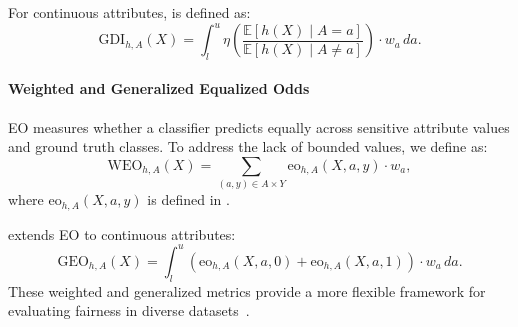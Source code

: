 For continuous attributes,  is defined as:
%
\begin{equation}
    \label{eq:gdi}
    \text{GDI}_{h,A}(X) = \int_{l}^{u} \eta \left( \frac{\mathbb{E}[h(X) \mid A = a]}{\mathbb{E}[h(X) \mid A \neq a]} \right) \cdot w_a \, da.
\end{equation}


\paragraph{Weighted and Generalized Equalized Odds}
%
\Gls{EO} measures whether a classifier predicts equally across sensitive attribute values and ground truth classes.
%
To address the lack of bounded values, we define  as:
%
\begin{equation}
    \label{eq:weo}
    \text{WEO}_{h,A}(X) = \sum_{(a, y) \in A \times Y} \text{eo}_{h,A}(X, a, y) \cdot w_a,
\end{equation}
%
where \( \text{eo}_{h,A}(X, a, y) \) is defined in .


 extends \gls{EO} to continuous attributes:
%
\begin{equation}
    \label{eq:geo}
    \text{GEO}_{h,A}(X) = \int_{l}^{u} \left( \text{eo}_{h,A}(X, a, 0) + \text{eo}_{h,A}(X, a, 1) \right) \cdot w_a \, da.
\end{equation}
%
These weighted and generalized metrics provide a more flexible framework for evaluating fairness in diverse datasets~\cite{placeholder}.
